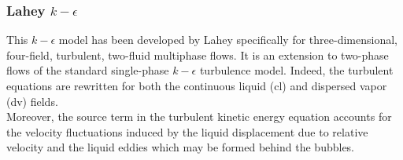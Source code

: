 \documentclass[11pt,a4paper]{article}
\begin{document}
\subsubsection{Lahey $k-\epsilon$}
This \textit{$k-\epsilon$} model has been developed by Lahey \citep{Lahey} specifically for three-dimensional, four-field, turbulent, two-fluid multiphase flows. It is an extension to two-phase flows of the standard single-phase $k-\epsilon$ turbulence model. Indeed, the turbulent equations are rewritten for both the continuous liquid (cl) and dispersed vapor (dv) fields. \\
Moreover, the source term in the turbulent kinetic energy equation accounts for the velocity fluctuations induced by the liquid displacement due to relative velocity and the liquid eddies which may be formed behind the bubbles.
\end{document}
